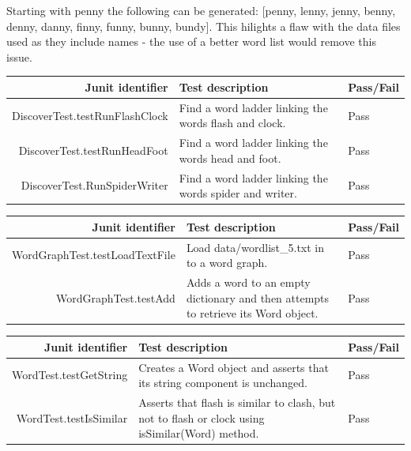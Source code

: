\documentclass[11pt]{article} %
\begin{document}
Starting with penny the following can be generated: [penny, lenny, jenny, benny, denny, danny, finny, funny, bunny, bundy]. This hilights a flaw with the data files used as they include names - the use of a better word list would remove this issue.

\begin{table}[h!!]
\begin{tabularx}{\linewidth}{| r | X | l |}
\hline
Junit identifier & Test description & Pass/Fail\\
\hline
DiscoverTest.testRunFlashClock & Find a word ladder linking the words flash and clock. & Pass\\
DiscoverTest.testRunHeadFoot & Find a word ladder linking the words head and foot. & Pass\\
DiscoverTest.RunSpiderWriter & Find a word ladder linking the words spider and writer. & Pass\\
\hline
\end{tabularx}
\end{table}

\begin{table}[h!!]
\begin{tabularx}{\linewidth}{| r | X | l |}
\hline
Junit identifier & Test description & Pass/Fail\\
\hline
WordGraphTest.testLoadTextFile & Load data/wordlist\_{}5.txt in to a word graph. & Pass \\
WordGraphTest.testAdd & Adds a word to an empty dictionary and then attempts to retrieve its Word object. & Pass\\
\hline
\end{tabularx}
\end{table}

\begin{table}[h!!]
\begin{tabularx}{\linewidth}{| r | X | l |}
\hline
Junit identifier & Test description & Pass/Fail\\
\hline
WordTest.testGetString & Creates a Word object and asserts that its string component is unchanged. & Pass\\
WordTest.testIsSimilar & Asserts that flash is similar to clash, but not to flash or clock using isSimilar(Word) method. & Pass\\
\hline
\end{tabularx}
\end{table}
\end{document}
